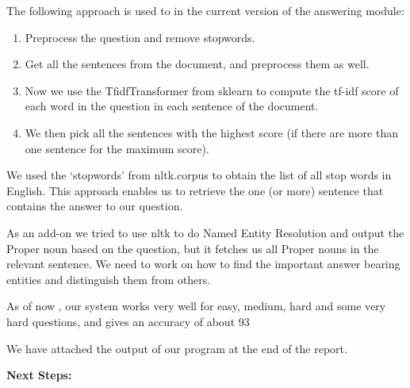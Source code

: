 \documentclass[12pt]{article}
\begin{document}
The following approach is used to in the current version of the answering module:
\begin{enumerate}
\item Preprocess the question and remove stopwords.
\item Get all the sentences from the document, and preprocess them as well.
\item Now we use the TfidfTransformer from sklearn to compute the tf-idf score of each word in the question in each sentence of the document.
\item We then pick all the sentences with the highest score (if there are more than one sentence for the maximum score).
\end{enumerate}

We used the ‘stopwords’ from nltk.corpus to obtain the list of all stop words in English. This approach enables us to retrieve the one (or more) sentence that contains the answer to our question.

As an add-on we tried to use nltk to do Named Entity Resolution and output the Proper noun based on the question, but it fetches us all Proper nouns in the relevant sentence. We need to work on how to find the important answer bearing entities and distinguish them from others.

As of now , our system works very well for easy, medium, hard and some very hard questions, and gives an accuracy of about 93%

We have attached the output of our program at the end of the report.

\textbf{Next Steps:}
\end{document}
